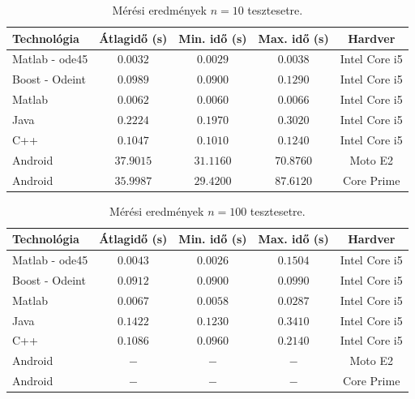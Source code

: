 \begin{table}[h!]
	\centering
	\begin{tabular}{ | l | c | c | c | c |}
		\hline 
		\textbf{Technológia} & \textbf{Átlagidő (s)} & \textbf{Min. idő (s)} & \textbf{Max. idő (s)} & \textbf{Hardver}\\
		\hline
		Matlab - ode45 & $ 0.0032 $ & $ 0.0029 $ & $ 0.0038 $ & Intel Core i5\\
		\hline
		Boost - Odeint & $ 0.0989 $ & $ 0.0900 $ & $ 0.1290 $ & Intel Core i5\\
		\hline
		Matlab & $ 0.0062 $ & $ 0.0060 $ & $ 0.0066 $ & Intel Core i5\\
		\hline
		Java & $ 0.2224 $ & $ 0.1970 $ & $ 0.3020 $ & Intel Core i5\\ 
		\hline
		C++ & $ 0.1047 $ & $ 0.1010 $ & $ 0.1240 $ & Intel Core i5\\
		\hline
		Android & $ 37.9015 $ & $ 31.1160 $ & $ 70.8760 $ & Moto E2\\
		\hline
		Android & $ 35.9987 $ & $ 29.4200 $ & $ 87.6120 $ & Core Prime\\
		\hline
	\end{tabular}
	\caption{Mérési eredmények  $ n = 10 $ tesztesetre.}
	\label{tablazat1}
\end{table}

\begin{table}[h!]
	\centering
	\begin{tabular}{ | l | c | c | c | c |}
		\hline 
		\textbf{Technológia} & \textbf{Átlagidő (s)} & \textbf{Min. idő (s)} & \textbf{Max. idő (s)} & \textbf{Hardver}\\
		\hline
		Matlab - ode45 & $ 0.0043 $ & $ 0.0026 $ & $ 0.1504 $ & Intel Core i5\\
		\hline
		Boost - Odeint & $ 0.0912 $ & $ 0.0900 $ & $ 0.0990 $ & Intel Core i5\\
		\hline
		Matlab & $ 0.0067 $ & $ 0.0058 $ & $ 0.0287 $ & Intel Core i5\\
		\hline
		Java & $ 0.1422 $ & $ 0.1230 $ & $ 0.3410 $ & Intel Core i5\\ 
		\hline
		C++ & $ 0.1086 $ & $ 0.0960 $ & $ 0.2140 $ & Intel Core i5\\
		\hline
		Android & $ - $ & $ - $ & $ - $ & Moto E2\\
		\hline
		Android & $ - $ & $ - $ & $ - $ & Core Prime\\
		\hline
	\end{tabular}
	\caption{Mérési eredmények  $ n = 100 $ tesztesetre.}
\end{table}



